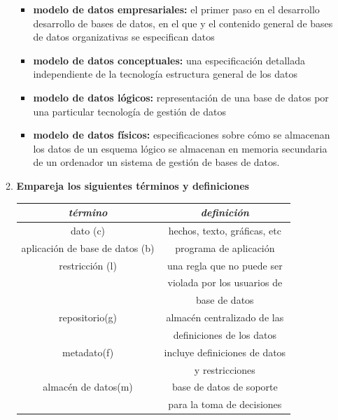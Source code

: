 \documentclass[letterpaper,12pt]{article}
\begin{document}
\begin{sloppypar}
\begin{itemize}
\begin{enumerate}
\begin{itemize}
            \item \textbf{modelo de datos empresariales:} el primer paso en el desarrollo desarrollo de bases de datos, en el que y el contenido general de bases de datos organizativas se especifican datos
            \item \textbf{modelo de datos conceptuales: }una especificación detallada independiente de la tecnología estructura general de los datos
            \item \textbf{modelo de datos lógicos: }representación de una base de datos por una particular tecnología de gestión de datos 
            \item \textbf{modelo de datos físicos:} especificaciones sobre cómo se almacenan los datos de un esquema lógico se almacenan en memoria secundaria de un ordenador un sistema de gestión de bases de datos.
        \end{itemize}
        \newpage
        \item \textbf{Empareja los siguientes términos y definiciones}
        \begin{center}
            \begin{tabular}[H]{|c|c|} \hline
            \textit{\textbf{\large término}} & \textit{\textbf{\large definición}} \\ \hline 
            dato (c) & hechos, texto, gráficas, etc\\ \hline
            
            aplicación de base de datos (b) & programa de aplicación\\ \hline

            restricción (l) & una regla que no puede ser \\ 
            & violada por los usuarios de \\ 
            & base de datos \\ \hline

            repositorio(g) & almacén centralizado de las\\ 
            & definiciones de los datos \\ \hline

            metadato(f) & incluye definiciones de datos\\
            & y restricciones \\ \hline

            almacén de datos(m) & base de datos de soporte \\ 
            & para la toma de decisiones \\\hline
            

\end{tabular}
\end{center}
\end{enumerate}
\end{itemize}
\end{sloppypar}
\end{document}
